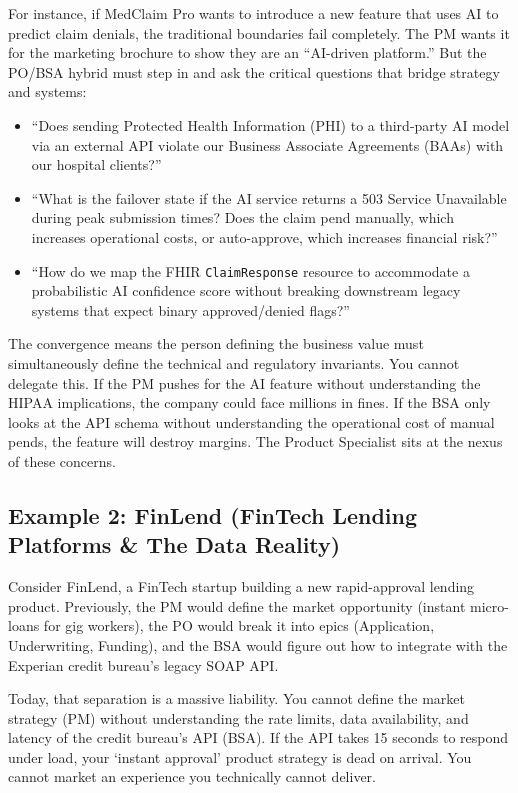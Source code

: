 For instance, if MedClaim Pro wants to introduce a new feature that uses
AI to predict claim denials, the traditional boundaries fail completely.
The PM wants it for the marketing brochure to show they are an
``AI-driven platform.'' But the PO/BSA hybrid must step in and ask the
critical questions that bridge strategy and systems:

\begin{itemize}
\tightlist
\item
  ``Does sending Protected Health Information (PHI) to a third-party AI
  model via an external API violate our Business Associate Agreements
  (BAAs) with our hospital clients?''
\item
  ``What is the failover state if the AI service returns a 503 Service
  Unavailable during peak submission times? Does the claim pend
  manually, which increases operational costs, or auto-approve, which
  increases financial risk?''
\item
  ``How do we map the FHIR \texttt{ClaimResponse} resource to
  accommodate a probabilistic AI confidence score without breaking
  downstream legacy systems that expect binary approved/denied flags?''
\end{itemize}

The convergence means the person defining the business value must
simultaneously define the technical and regulatory invariants. You
cannot delegate this. If the PM pushes for the AI feature without
understanding the HIPAA implications, the company could face millions in
fines. If the BSA only looks at the API schema without understanding the
operational cost of manual pends, the feature will destroy margins. The
Product Specialist sits at the nexus of these concerns.

\subsection{Example 2: FinLend (FinTech Lending Platforms \& The Data
Reality)}\label{example-2-finlend-fintech-lending-platforms-the-data-reality}

Consider FinLend, a FinTech startup building a new rapid-approval
lending product. Previously, the PM would define the market opportunity
(instant micro-loans for gig workers), the PO would break it into epics
(Application, Underwriting, Funding), and the BSA would figure out how
to integrate with the Experian credit bureau's legacy SOAP API.

Today, that separation is a massive liability. You cannot define the
market strategy (PM) without understanding the rate limits, data
availability, and latency of the credit bureau's API (BSA). If the API
takes 15 seconds to respond under load, your `instant approval' product
strategy is dead on arrival. You cannot market an experience you
technically cannot deliver.

